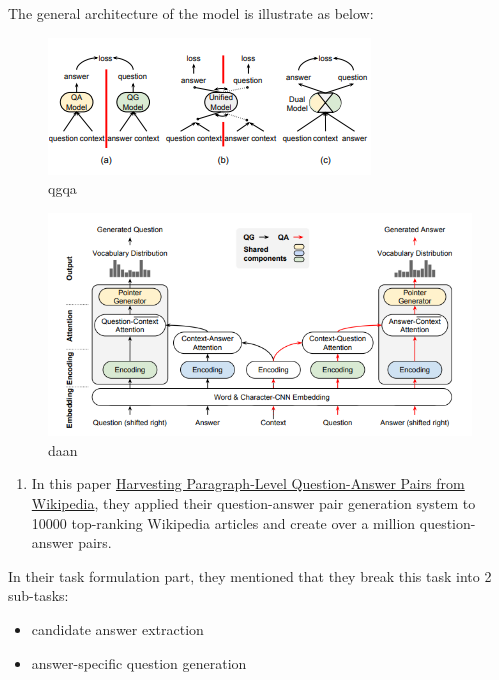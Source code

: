 \documentclass[]{book}
\providecommand{\tightlist}{%
  \setlength{\itemsep}{0pt}\setlength{\parskip}{0pt}}
\theoremstyle{definition}
\theoremstyle{definition}
\theoremstyle{definition}
\theoremstyle{remark}
\begin{document}
The general architecture of the model is illustrate as below:

\begin{figure}
\centering
\includegraphics{img/qgqa.png}
\caption{qgqa}
\end{figure}

\begin{figure}
\centering
\includegraphics{img/daan.png}
\caption{daan}
\end{figure}

\begin{enumerate}
\def\labelenumi{\arabic{enumi}.}
\setcounter{enumi}{1}
\tightlist
\item
  In this paper \href{https://arxiv.org/pdf/1805.05942.pdf}{Harvesting
  Paragraph-Level Question-Answer Pairs from Wikipedia}, they applied
  their question-answer pair generation system to 10000 top-ranking
  Wikipedia articles and create over a million question-answer pairs.
\end{enumerate}

In their task formulation part, they mentioned that they break this task
into 2 sub-tasks:

\begin{itemize}
\item
  candidate answer extraction
\item
  answer-specific question generation
\end{itemize}
\end{document}
